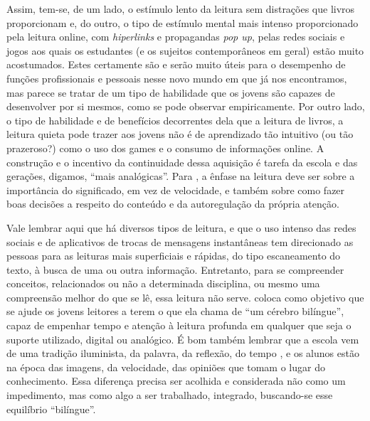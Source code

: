 Assim, tem-se, de um lado, o estímulo lento da leitura sem distrações que livros proporcionam e, do outro, o tipo de estímulo mental mais intenso proporcionado pela leitura online, com \textit{hiperlinks} e propagandas \textit{pop up}, pelas redes sociais e jogos aos quais os estudantes (e os sujeitos contemporâneos em geral) estão muito acostumados. Estes certamente são e serão muito úteis para o desempenho de funções profissionais e pessoais nesse novo mundo em que já nos encontramos, mas parece se tratar de um tipo de habilidade que os jovens são capazes de desenvolver por si mesmos, como se pode observar empiricamente. Por outro lado, o tipo de habilidade e de benefícios decorrentes dela que a leitura de livros, a leitura quieta pode trazer aos jovens não é de aprendizado tão intuitivo (ou tão prazeroso?) como o uso dos games e o consumo de informações online. A construção e o incentivo da continuidade dessa aquisição é tarefa da escola e das gerações, digamos, “mais analógicas”. Para \textcite[p. 176–177]{wolf2019}, a ênfase na leitura deve ser sobre a importância do significado, em vez de velocidade, e também sobre como fazer boas decisões a respeito do conteúdo e da autoregulação da própria atenção.

Vale lembrar aqui que há diversos tipos de leitura, e que o uso intenso das redes sociais e de aplicativos de trocas de mensagens instantâneas tem direcionado as pessoas para as leituras mais superficiais e rápidas, do tipo escaneamento do texto, à busca de uma ou outra informação. Entretanto, para se compreender conceitos, relacionados ou não a determinada disciplina, ou mesmo uma compreensão melhor do que se lê, essa leitura não serve. \textcite[p. 177]{wolf2019} coloca como objetivo que se ajude os jovens leitores a terem o que ela chama de “um cérebro bilíngue”, capaz de empenhar tempo e atenção à leitura profunda em qualquer que seja o suporte utilizado, digital ou analógico. É bom também lembrar que a escola vem de uma tradição iluminista, da palavra, da reflexão, do tempo \cite{sibilia2012}, e os alunos estão na época das imagens, da velocidade, das opiniões que tomam o lugar do conhecimento. Essa diferença precisa ser acolhida e considerada não como um impedimento, mas como algo a ser trabalhado, integrado, buscando-se esse equilíbrio “bilíngue”.

